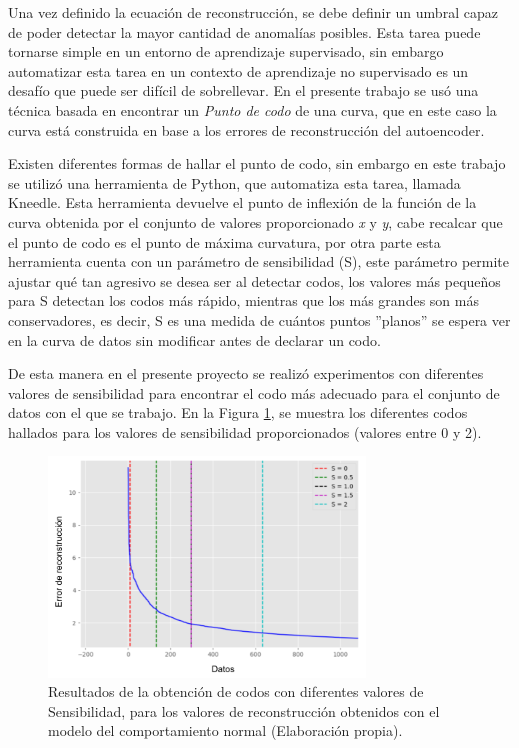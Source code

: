 Una vez definido la ecuaci\'{o}n de reconstrucci\'{o}n, se debe definir un umbral capaz de poder detectar la mayor cantidad de anomal\'{i}as posibles. Esta tarea puede tornarse simple en un entorno de aprendizaje supervisado, sin embargo automatizar esta tarea en un contexto de aprendizaje no supervisado es un desaf\'{i}o que puede ser dif\'{i}cil de sobrellevar. En el presente trabajo se us\'{o} una t\'{e}cnica basada en encontrar un \textit{Punto de codo} de una curva, que en este caso la curva est\'{a} construida en base a los errores de reconstrucci\'{o}n del autoencoder.

\vspace{5mm} %

Existen diferentes formas de hallar el punto de codo, sin embargo en este trabajo se utiliz\'{o} una herramienta de Python, que automatiza esta tarea, llamada Kneedle. Esta herramienta devuelve el punto de inflexi\'{o}n de la funci\'{o}n de la curva obtenida por el conjunto de valores proporcionado \textit{x} y \textit{y}, cabe recalcar que el punto de codo es el punto de m\'{a}xima curvatura, por otra parte esta herramienta cuenta con un par\'{a}metro de sensibilidad (S), este par\'{a}metro permite ajustar qu\'{e} tan agresivo se desea ser al detectar codos, los valores m\'{a}s peque\~{n}os para S detectan los codos m\'{a}s r\'{a}pido, mientras que los m\'{a}s grandes son m\'{a}s conservadores, es decir, S es una medida de cu\'{a}ntos puntos ''planos'' se espera ver en la curva de datos sin modificar antes de declarar un codo.

\vspace{5mm} %

De esta manera en el presente proyecto se realiz\'{o} experimentos con diferentes valores de sensibilidad para encontrar el codo m\'{a}s adecuado para el conjunto de datos con el que se trabajo. En la Figura \ref{fig:zoom_codos}, se muestra los diferentes codos hallados para los valores de sensibilidad proporcionados (valores entre 0 y 2).

\begin{figure}[H]
        \centering
            \includegraphics[width=0.75\textwidth, frame]{imagenes/Cap5/zoom_codos}
        \caption{Resultados de la obtenci\'{o}n de codos con diferentes valores de Sensibilidad, para los valores de reconstrucci\'{o}n obtenidos con el modelo del comportamiento normal (Elaboraci\'{o}n propia).}
		\label{fig:zoom_codos}
\end{figure}

